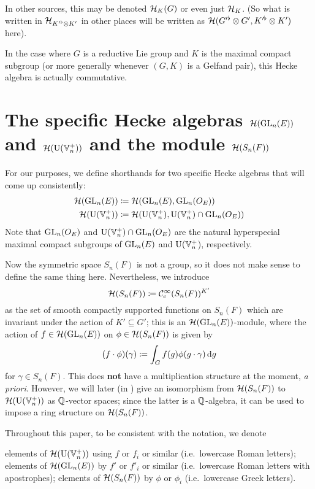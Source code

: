 In other sources, this may be denoted $\mathcal H_K(G)$ or even just $\mathcal H_K$.
(So what is written in $\mathcal H_{K'^\flat \otimes K'}$ in other places
will be written as $\mathcal H(G'^\flat \otimes G', K'^\flat \otimes K')$ here).

In the case where $G$ is a reductive Lie group and
$K$ is the maximal compact subgroup
(or more generally whenever $(G,K)$ is a Gelfand pair),
this Hecke algebra is actually commutative.

\section{The specific Hecke algebras $\mathcal H(\operatorname{GL}_n(E))$ and $\mathcal H(\operatorname{U}(\mathbb V_n^+))$ and the module $\mathcal H(S_n(F))$}
For our purposes, we define shorthands for two specific Hecke algebras
that will come up consistently:
\begin{align*}
  \mathcal H(\operatorname{GL}_n(E)) &\coloneqq \mathcal H(\operatorname{GL}_n(E), \operatorname{GL}_n(O_E)) \\
  \mathcal H(\operatorname{U}(\mathbb V_n^+)) &\coloneqq \mathcal H(\operatorname{U}(\mathbb V_n^+), \operatorname{U}(\mathbb V_n^+) \cap \operatorname{GL}_n(O_E))
\end{align*}
Note that $\operatorname{GL}_n(O_E)$ and $\operatorname{U}(\mathbb V_n^+) \cap \operatorname{GL}_n(O_E)$
are the natural hyperspecial maximal compact subgroups of $\operatorname{GL}_n(E)$ and $\operatorname{U}(\mathbb V_n^+$),
respectively.

Now the symmetric space $S_n(F)$ is not a group,
so it does not make sense to define the same thing here.
Nevertheless, we introduce
\[ \mathcal H(S_n(F)) \coloneqq \mathcal C_{\mathrm{c}}^{\infty}(S_n(F))^{K'} \]
as the set of smooth compactly supported functions on $S_n(F)$
which are invariant under the action of $K' \subseteq G'$;
this is an $\mathcal H(\operatorname{GL}_n(E))$-module,
where the action of $f \in \mathcal H(\operatorname{GL}_n(E))$ on $\phi \in \mathcal H(S_n(F))$ is given by
\[ (f \cdot \phi)(\gamma) \coloneqq \int_G f(g) \phi(g \cdot \gamma) \odif g \]
for $\gamma \in S_n(F)$.
This does \textbf{not} have a multiplication structure at the moment, \emph{a priori}.
However, we will later (in ) give an isomorphism from $\mathcal H(S_n(F))$
to $\mathcal H(\operatorname{U}(\mathbb V_n^+))$ as $\mathbb Q$-vector spaces;
since the latter is a $\mathbb Q$-algebra, it can be used to impose a ring structure on $\mathcal H(S_n(F))$.

Throughout this paper, to be consistent with the notation, we denote
\begin{itemize}
  \ii elements of $\mathcal H(\operatorname{U}(\mathbb V_n^+))$ using $f$ or $f_i$ or similar
    (i.e.\ lowercase Roman letters);
  \ii elements of $\mathcal H(\operatorname{GL}_n(E))$ by $f'$ or $f'_i$ or similar
    (i.e.\ lowercase Roman letters with apostrophes);
  \ii elements of $\mathcal H(S_n(F))$ by $\phi$ or $\phi_i$
    (i.e.\ lowercase Greek letters).
\end{itemize}
